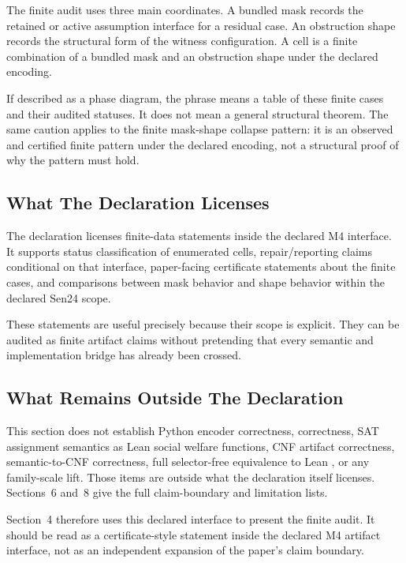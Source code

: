 The finite audit uses three main coordinates. A bundled mask records the
retained or active assumption interface for a residual case. An obstruction
shape records the structural form of the witness configuration. A cell is a
finite combination of a bundled mask and an obstruction shape under the
declared encoding.

If described as a phase diagram, the phrase means a table of these finite
cases and their audited statuses. It does not mean a general structural
theorem. The same caution applies to the finite mask-shape collapse pattern:
it is an observed and certified finite pattern under the declared encoding,
not a structural proof of why the pattern must hold.

\subsection*{What The Declaration Licenses}

The declaration licenses finite-data statements inside the declared M4
interface. It supports status classification of enumerated cells,
repair/reporting claims conditional on that interface, paper-facing
certificate statements about the finite cases, and comparisons between mask
behavior and shape behavior within the declared Sen24 scope.

These statements are useful precisely because their scope is explicit. They
can be audited as finite artifact claims without pretending that every
semantic and implementation bridge has already been crossed.

\subsection*{What Remains Outside The Declaration}

This section does not establish Python encoder correctness,
 correctness, SAT assignment semantics as Lean social
welfare functions, CNF artifact correctness, semantic-to-CNF correctness, full
selector-free equivalence to Lean , or any family-scale lift.
Those items are outside what the declaration itself licenses. Sections~6
and~8 give the full claim-boundary and limitation lists.

Section~4 therefore uses this declared interface to present the finite audit.
It should be read as a certificate-style statement inside the declared M4
artifact interface, not as an independent expansion of the paper's claim
boundary.
